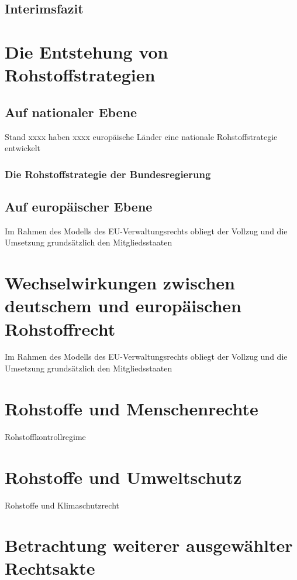 \documentclass[12pt,a4paper,oneside]{book} %
\begin{document}
	\subsection{Interimsfazit}
	
	\section{Die Entstehung von Rohstoffstrategien}
	
	\subsection{Auf nationaler Ebene}
	Stand xxxx haben xxxx europäische Länder eine nationale Rohstoffstrategie entwickelt
	
	\subsubsection{Die Rohstoffstrategie der Bundesregierung}
	
	\subsection{Auf europäischer Ebene}
	
	Im Rahmen des Modells des EU-Verwaltungsrechts obliegt der Vollzug und die Umsetzung grundsätzlich den Mitgliedsstaaten
	
	\section{Wechselwirkungen zwischen deutschem und europäischen Rohstoffrecht}
		Im Rahmen des Modells des EU-Verwaltungsrechts obliegt der Vollzug und die Umsetzung grundsätzlich den Mitgliedsstaaten
	
	\section{Rohstoffe und Menschenrechte}
	
	Rohstoffkontrollregime
	
	\section{Rohstoffe und Umweltschutz}
	
	Rohstoffe und Klimaschutzrecht
	
	
	\section{Betrachtung weiterer ausgewählter Rechtsakte}
	
\end{document}
